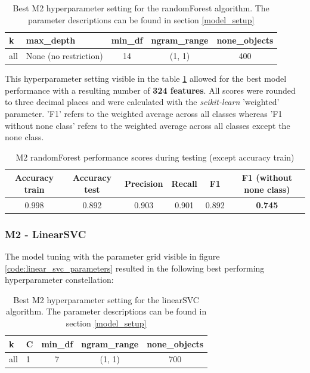 \begin{table}[h!]
\begin{center}
\caption{Best M2 hyperparameter setting for the randomForest algorithm. The parameter descriptions can be found in section \ref{model_setup}}\vspace{1ex}
\label{tab:m2_randomForest_bestParams}
\begin{tabular}{llccc}\hline
k & max\_depth & min\_df & ngram\_range & none\_objects \\ \hline
all & None (no restriction) & 14 & (1, 1) & 400 \\ \hline
\end{tabular}
\end{center}
\end{table}

This hyperparameter setting visible in the table \ref{tab:m2_randomForest_bestParams} allowed for the best model performance with a resulting number of \textbf{324 features}. All scores were rounded to three decimal places and were calculated with the \textit{scikit-learn} 'weighted' parameter. 'F1' refers to the weighted average across all classes whereas 'F1 without none class' refers to the weighted average across all classes except the none class.

\begin{table}[h!]
\begin{center}
\caption{M2 randomForest performance scores during testing (except accuracy train)}\vspace{1ex}
\label{tab:m2_randomForest_bestscores}
\begin{tabular}{cccccc}\hline
Accuracy train & Accuracy test & Precision & Recall & F1 & F1 (without none class)\\ \hline
0.998 & 0.892 & 0.903 & 0.901 & 0.892 & \textbf{0.745}\\ \hline
\end{tabular}
\end{center}
\end{table}

\subsubsection{M2 - LinearSVC}
The model tuning with the parameter grid visible in figure \ref{code:linear_svc_parameters} resulted in the following best performing hyperparameter constellation:

\begin{table}[h!]
\begin{center}
\caption{Best M2 hyperparameter setting for the linearSVC algorithm. The parameter descriptions can be found in section \ref{model_setup}}\vspace{1ex}
\label{tab:m2_linearSVC_bestParams}
\begin{tabular}{llccc}\hline
k & C & min\_df & ngram\_range & none\_objects \\ \hline
all & 1 & 7 & (1, 1) & 700 \\ \hline
\end{tabular}
\end{center}
\end{table}

